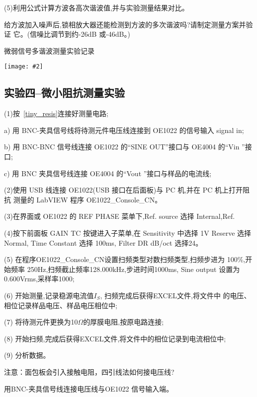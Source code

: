 \documentclass[11pt,a4paper]{ctexart}
\newcommand{\cpic}[2]{
\begin{center}
\texttt{[image: \#2]}
\end{center}
}
\begin{document}
(5)利用公式计算方波各高次谐波值,并与实验测量结果对比。

给方波加入噪声后,锁相放大器还能检测到方波的多次谐波吗?请制定测量方案并验证
它。(信噪比调节到约-26dB 或-46dB。)
\begin{table}[H]
  \caption{微弱信号多谐波测量实验记录}
  \cpic{0.4}{square_table}
\end{table}


\subsection{实验四--微小阻抗测量实验}


(1)按~\cref{tiny_resis}连接好测量电路;

a) 用 BNC-夹具信号线将待测元件电压线连接到 OE1022 的信号输入 signal in;

b) 用 BNC-BNC 信号线连接 OE1022 的“SINE OUT”接口与 OE4004 的“Vin ”接口;

c) 用 BNC 夹具信号线连接 OE4004 的“Vout ”接口与样品的电流线;

(2)使用 USB 线连接 OE1022(USB 接口在后面板)与 PC 机,并在 PC 机上打开阻抗
测量的 LabVIEW 程序 OE1022\_Console\_CN。

(3)在界面或 OE1022 的 REF PHASE 菜单下,Ref. source 选择 Internal,Ref.

(4)按下前面板 GAIN TC 按键进入子菜单,在 Sensitivity 中选择 1V
Reserve 选择 Normal, Time Constant 选择 100ms, Filter DR
dB/oct 选择24。

(5) 在程序OE1022\_Console\_CN设置扫频类型对数扫频类型,扫频步进为
100\%,开始频率 250Hz,扫频截止频率128.000kHz,步进时间1000ms,
Sine output 设置为0.600Vrms,采样率1000;

(6) 开始测量,记录稳源电流值$I_S$, 扫频完成后获得EXCEL文件,将文件中
的电压、相位记录样品电压、样品电压相位中;

(7) 将待测元件更换为10$\Omega$的厚膜电阻,按原电路连接;

(8) 开始扫频,完成后获得EXCEL文件,将文件中的相位记录到电流相位中;

(9) 分析数据。

{\color{red} 注意：面包板会引入接触电阻，四引线法如何接电压线?

用BNC-夹具信号线连接电压线与OE1022 信号输入端。}
\end{document}
